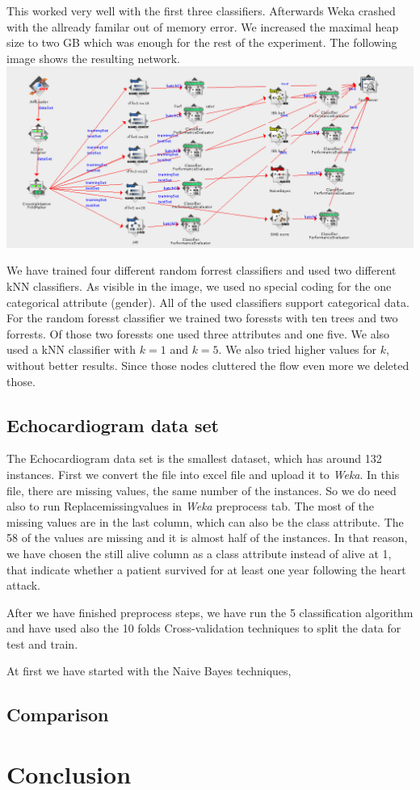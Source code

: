\documentclass[a4paper]{article}
\begin{document}
This worked very well with the first three classifiers. Afterwards Weka crashed
with the allready familar out of memory error. We increased the maximal heap
size to two GB which was enough for the rest of the experiment. 
The following image shows the resulting network. 
\includegraphics[angle=90, scale=0.9]{liver_kf}

We have trained four different random forrest classifiers and used two different
kNN classifiers. As visible in the image, we used no special coding for the one
categorical attribute (gender). All of the used classifiers support categorical
data. For the random foresst classifier we trained two foressts with ten trees
and two forrests. Of those two foressts one used three attributes and one five. 
We also used a kNN classifier with $k=1$ and $k=5$. We also tried higher values
for $k$, without better results. Since those nodes cluttered the flow even more
we deleted those. 
\subsection{Echocardiogram data set}

The Echocardiogram data set is the smallest dataset, which has around 132
instances. First we convert the file into excel file and upload it to
\emph{Weka}. In this file, there are missing values, the same number of the
instances. So we do need also to run Replacemissingvalues in \emph{Weka}
preprocess tab. The most of the missing values are in the last column, which can
also be the class attribute. The 58 of the values are missing and it is almost
half of the instances. In that reason, we have chosen the still alive column as
a class attribute instead of alive at 1, that indicate whether a patient
survived for at least one year following the heart attack. 

After we have finished preprocess steps, we have run the 5 classification
algorithm and have used also the 10 folds Cross-validation techniques to split
the data for test and train. 

At first we have started with the Naive Bayes techniques,
\subsection{Comparison}

\section{Conclusion}
\end{document}
